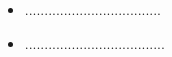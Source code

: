 \begin{itemize}
	\item ...................................
	\item ....................................
\end{itemize}